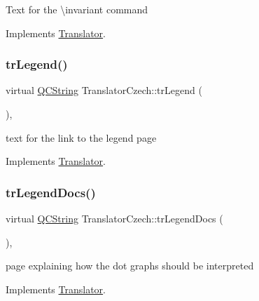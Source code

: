 Text for the \textbackslash{}invariant command 

Implements \mbox{\hyperlink{class_translator}{Translator}}.

\mbox{\label{class_translator_czech_a9546f2702cbb8eb20f7a068954a31162}} 
\subsubsection{\texorpdfstring{trLegend()}{trLegend()}}
{\footnotesize\ttfamily virtual \mbox{\hyperlink{class_q_c_string}{Q\+C\+String}} Translator\+Czech\+::tr\+Legend (\begin{DoxyParamCaption}{ }\end{DoxyParamCaption})\hspace{0.3cm}{\ttfamily [inline]}, {\ttfamily [virtual]}}

text for the link to the legend page 

Implements \mbox{\hyperlink{class_translator}{Translator}}.

\mbox{\label{class_translator_czech_afe51ce33cdc6dc7161171591683b14aa}} 
\subsubsection{\texorpdfstring{trLegendDocs()}{trLegendDocs()}}
{\footnotesize\ttfamily virtual \mbox{\hyperlink{class_q_c_string}{Q\+C\+String}} Translator\+Czech\+::tr\+Legend\+Docs (\begin{DoxyParamCaption}{ }\end{DoxyParamCaption})\hspace{0.3cm}{\ttfamily [inline]}, {\ttfamily [virtual]}}

page explaining how the dot graph\textquotesingle{}s should be interpreted 

Implements \mbox{\hyperlink{class_translator}{Translator}}.

\mbox{\label{class_translator_czech_a8db0254e1b8179caba1e484f3fa69e0f}} 
